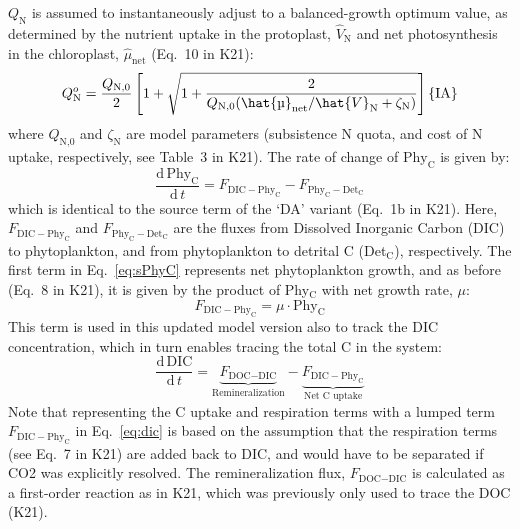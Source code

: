 \documentclass[gmd, manuscript]{copernicus}
\begin{document}
$Q_{\text{N}}$ is assumed to instantaneously adjust to a balanced-growth optimum value, as determined by the nutrient uptake in the protoplast, $\hat{V}_{\text{N}}$ and net photosynthesis in the chloroplast, $\hat{\mu}_{\text{net}}$ (Eq.~10 in K21):
\begin{equation}\label{eq:Qopt}
 Q_{\text{N}}^o= \frac{Q_{\text{N,0}}}{2} \left[1+\sqrt{1+\frac{2}{Q_{\text{N,0}}{({\hat{\mu}_{\text{net}}}/{\hat{V}_{\text{N}}}+\zeta_{\text{N}} )}}} \right] \hfill \{\text{IA}\}
\end{equation}
where $Q_{\text{N,0}}$ and $\zeta_{\text{N}}$ are model parameters (subsistence N quota, and cost of N uptake, respectively, see Table~3 in K21). The rate of change of $\text{Phy}_{\text{C}}$ is given by:
\begin{equation} \label{eq:sPhyC}
\frac{\mathrm{d}\, \text{Phy}_{\text{C}}}{\mathrm{d}\, t} = F_{\text{DIC}-\text{Phy}_{\text{C}}} - F_{\text{Phy}_{\text{C}}-\text{Det}_{\text{C}}}
\end{equation}
which is identical to the source term of the `DA' variant (Eq.~1b in K21). Here, $F_{\text{DIC}-\text{Phy}_{\text{C}}}$ and $F_{\text{Phy}_{\text{C}}-\text{Det}_{\text{C}}}$ are the fluxes from Dissolved Inorganic Carbon (DIC) to phytoplankton, and from phytoplankton to detrital C (Det$_{\text{C}}$), respectively. The first term in Eq.~\eqref{eq:sPhyC} represents net phytoplankton growth, and as before (Eq.~8 in K21), it is given by the product of Phy$_{\text{C}}$ with net growth rate, $\mu$:
\begin{equation} \label{eq:fdicphyc}
 F_{\text{DIC}-\text{Phy}_{\text{C}}} = \mu \cdot \text{Phy}_{\text{C}}
\end{equation}
This term is used in this updated model version also to track the DIC concentration, which in turn enables tracing the total C in the system:
\begin{equation} \label{eq:dic}
  \frac{\mathrm{d}\, \text{DIC}}{\mathrm{d}\, t} = \underbrace{F_{\text{DOC}-\text{DIC}}}_{\textrm{Remineralization}} - \underbrace{F_{\text{DIC}-\text{Phy}_{\text{C}}}}_{\textrm{Net C uptake}}
\end{equation}
Note that representing the C uptake and respiration terms with a lumped term $F_{\text{DIC}-\text{Phy}_{\text{C}}}$ in Eq.~\eqref{eq:dic} is based on the assumption that the respiration terms (see Eq.~7 in K21) are added back to DIC, and would have to be separated if CO2 was explicitly resolved. The remineralization flux, $F_{\text{DOC}-\text{DIC}}$ is calculated as a first-order reaction as in K21, which was previously only used to trace the DOC (K21).
\end{document}
